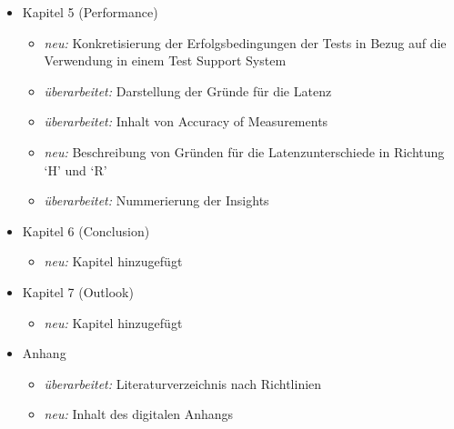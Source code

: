 \begin{itemize}
		\item Kapitel 5 (Performance)
		\begin{itemize}
  			\item \textit{neu:} Konkretisierung der Erfolgsbedingungen der Tests in Bezug auf die Verwendung in einem Test Support System
  			\item \textit{überarbeitet:} Darstellung der Gründe für die Latenz
  			\item \textit{überarbeitet:} Inhalt von Accuracy of Measurements
  			\item \textit{neu:} Beschreibung von Gründen für die Latenzunterschiede in Richtung `H' und `R'
  			\item \textit{überarbeitet:} Nummerierung der Insights
		\end{itemize}
		
		\item Kapitel 6 (Conclusion)
		\begin{itemize}
  			\item \textit{neu:} Kapitel hinzugefügt
		\end{itemize}
		
		\item Kapitel 7 (Outlook)
		\begin{itemize}
  			\item \textit{neu:} Kapitel hinzugefügt
		\end{itemize}
		
		\item Anhang
		\begin{itemize}
  			\item \textit{überarbeitet:} Literaturverzeichnis nach Richtlinien
  			\item \textit{neu:} Inhalt des digitalen Anhangs
		\end{itemize} 
	\end{itemize}
